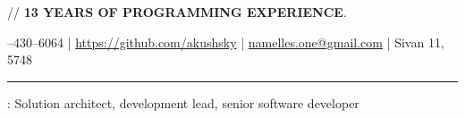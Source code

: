 \documentclass[11pt]{article}
\newif\ifdetailed
\begin{document}
%
{\small{// {\textbf{13 YEARS OF PROGRAMMING EXPERIENCE}}. }}

\vspace{0.5em}

--430--6064    |    \url{https://github.com/akushsky}   |   \href{mailto:namelles.one@gmail.com}{namelles.one@gmail.com}  | Sivan 11, 5748

\vspace{0.5em}

\hrule

\vspace{1.5em}

\ifdetailed
\noindent {\textbf{CAREER OBJECTIVE}}: To gain \textbf{international experience} in hi-tech related role (solution architect, senior software engineer). Preferably working with highload systems, big data and distributed software.
\else
{}: Solution architect, development lead, senior software developer
\fi

\vspace{1em}
\end{document}
